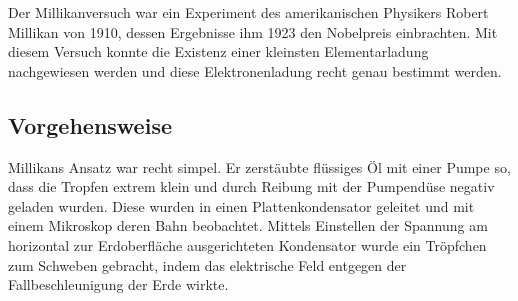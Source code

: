 




%
%	






Der Millikanversuch war ein Experiment des amerikanischen Physikers Robert Millikan von 1910, dessen Ergebnisse ihm 1923 den Nobelpreis einbrachten. Mit diesem Versuch konnte die Existenz einer kleinsten Elementarladung nachgewiesen werden und diese Elektronenladung recht genau bestimmt werden.

\subsection{Vorgehensweise}

Millikans Ansatz war recht simpel. Er zerstäubte flüssiges Öl mit einer Pumpe so, dass die Tropfen extrem klein und durch Reibung mit der Pumpendüse negativ geladen wurden. Diese wurden in einen Plattenkondensator geleitet und mit einem Mikroskop deren Bahn beobachtet. Mittels Einstellen der Spannung am horizontal zur Erdoberfläche ausgerichteten Kondensator wurde ein Tröpfchen zum Schweben gebracht, indem das elektrische Feld entgegen der Fallbeschleunigung der Erde wirkte.

